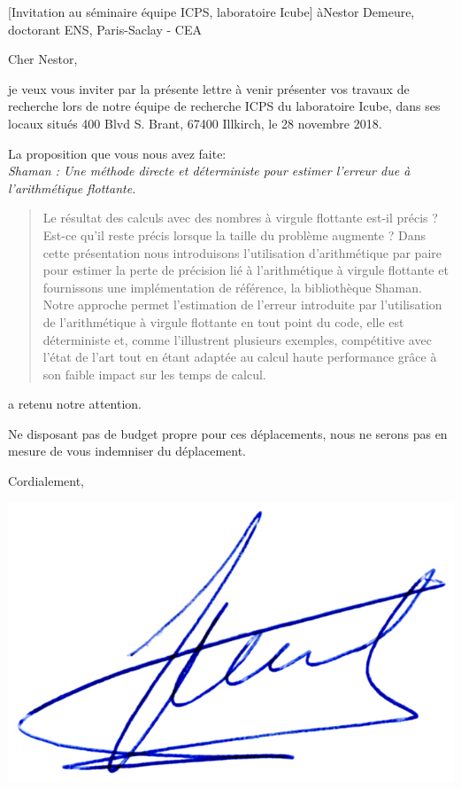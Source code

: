 \documentclass[a4paper,10pt]{article}
\begin{document}


\begin{letter}[Invitation au séminaire équipe ICPS, laboratoire Icube]
  {à}{Nestor Demeure, doctorant ENS, Paris-Saclay - CEA}

  Cher Nestor,

  je veux vous inviter  par la présente lettre à venir  présenter vos travaux de
  recherche lors  de notre équipe de  recherche ICPS du laboratoire  Icube, dans
  ses locaux situés 400 Blvd S. Brant, 67400 Illkirch, le 28 novembre 2018.

  La proposition que vous nous avez faite:\\

  \emph{Shaman : Une méthode directe et déterministe pour estimer l’erreur due à l’arithmétique flottante.}

  \begin{quote}
    Le résultat des calculs avec des nombres à virgule flottante est-il précis ?
    Est-ce qu'il  reste précis  lorsque la  taille du  problème augmente  ? Dans
    cette présentation nous introduisons  l'utilisation d'arithmétique par paire
    pour estimer la perte de précision  lié à l'arithmétique à virgule flottante
    et  fournissons une  implémentation  de référence,  la bibliothèque  Shaman.
    Notre approche permet l'estimation  de l'erreur introduite par l'utilisation
    de  l'arithmétique à  virgule  flottante en  tout point  du  code, elle  est
    déterministe  et, comme  l'illustrent plusieurs  exemples, compétitive  avec
    l'état de  l'art tout en étant  adaptée au calcul haute  performance grâce à
    son faible impact sur les temps de calcul.
\end{quote}

  a retenu notre attention.

  Ne disposant pas de budget propre pour ces déplacements, nous ne serons pas en
  mesure de vous indemniser du déplacement.

  Cordialement,

\end{letter}
\begin{flushright}
\includegraphics[width=.20\textwidth]{signgenaud.jpg}
\end{flushright}
\end{document}
